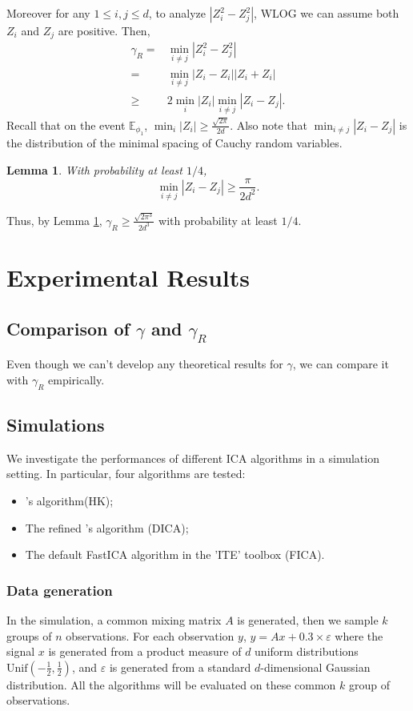 \documentclass[twoside]{article}
\newcommand{\Ephione}{\mathbb{E}_{\phi_1}}
\newtheorem{lemma}{Lemma}[section]
\theoremstyle{definition}
\newcommand{\eps}{\varepsilon}
\begin{document}
Moreover for any $1\le i, j \le d$, to analyze $\left\vert Z_i^2 - Z_j^2\right\vert
$, WLOG we can assume both $Z_i$ and $Z_j$ are positive. Then, 
\begin{align*}
\gamma_R =	& \min_{i\neq j} \left\vert Z_i^2 - Z_j^2 \right\vert \\
	=		& \min_{i\neq j}\left\vert Z_i - Z_i \right\vert	\left\vert Z_i + Z_i \right\vert \\
	\ge 	& 2\min_i\vert Z_i\vert\min_{i\neq j} \left\vert Z_i - Z_j \right\vert.
\end{align*}
Recall that on the event $\Ephione$, $\min_i\vert Z_i \vert \ge \frac{\sqrt{2\pi}}{2d}$. 
Also note that $\min_{i\neq j} \left\vert Z_i - Z_j \right\vert$ is the distribution of the minimal spacing of Cauchy random variables.

\begin{lemma}
\label{lem:CauchyGap}
With probability at least $1/4$,
\[
\min_{i\neq j} \left\vert Z_i - Z_j \right\vert \ge \frac{\pi}{2d^2}.
\]
\end{lemma}
Thus, by Lemma \ref{lem:CauchyGap}, $\gamma_R \ge \frac{\sqrt{2\pi^3}}{2d^3}$ with probability at least $1/4$.

\section{Experimental Results}
\label{sec:ExpRes}
\subsection{Comparison of $\gamma$ and $\gamma_R$}
Even though we can't develop any theoretical results for $\gamma$, we can compare it with $\gamma_R$ empirically.

\subsection{Simulations}
We investigate the performances of different ICA algorithms in a simulation setting. In particular, four algorithms are tested: 
\begin{itemize}
\item \citet{DHsu2012}'s algorithm(HK);
\item The refined \citet{DHsu2012}'s algorithm (DICA);
\item The default FastICA algorithm in the 'ITE' toolbox \cite{szabo12separation} (FICA). 
\end{itemize}
\subsubsection{Data generation}
In the simulation, a common mixing matrix $A$ is generated, then we sample $k$ groups of $n$ observations. 
For each observation $y$, $y = Ax+ 0.3\times\eps$ where the signal $x$ is generated from a product measure of $d$ uniform distributions $\text{Unif}(-\frac12, \frac12)$, and $\eps$ is generated from a standard $d$-dimensional Gaussian distribution. 
All the algorithms will be evaluated on these common $k$ group of observations.
\end{document}

